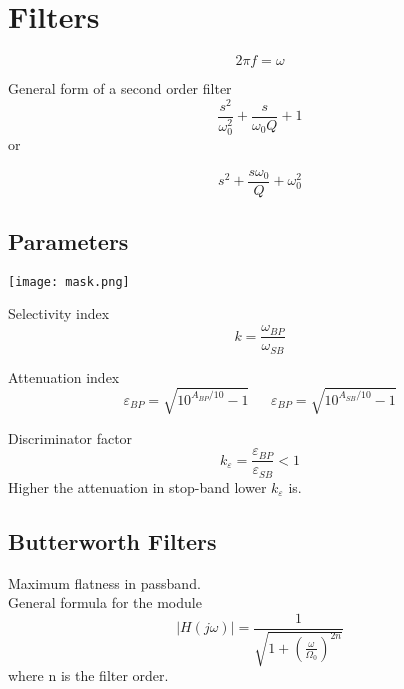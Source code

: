 \chapter{Filters}

\begin{equation}
2\pi f=\omega
\end{equation}

General form of a second order filter 
\begin{equation}
\frac{s^2}{\omega_0^2}+\frac{s}{\omega_0 Q}+1
\end{equation}
\centering
or

\raggedright
\begin{equation}
s^2+\frac{s \omega_0}{Q}+\omega_0^2
\end{equation}
\section{Parameters}

\centering
\texttt{[image: mask.png]}\\
\raggedright

Selectivity index
\begin{equation}
k=\frac{\omega_{BP}}{\omega_{SB}}
\end{equation}

Attenuation index
\begin{equation}
\varepsilon_{BP}=\sqrt{10^{A_{BP}/10}-1} \ \ \ \ \ \ \ \varepsilon_{BP}=\sqrt{10^{A_{SB}/10}-1}
\end{equation}

Discriminator factor 
\begin{equation}
k_{\varepsilon}=\frac{\varepsilon_{BP}}{\varepsilon_{SB}}<1
\end{equation}
Higher the attenuation in stop-band lower $k_{\varepsilon}$ is.

\section{Butterworth Filters}
Maximum flatness in passband.\\

General formula for the module 
\begin{equation}
|H(j\omega)|=\frac{1}{\sqrt{1+(\frac{\omega}{\Omega_0})^{2n}}}
\end{equation}
where n is the filter order.\\

